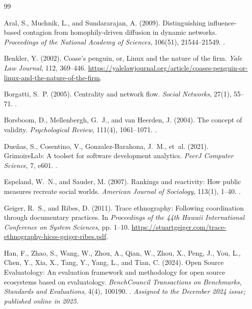 \begin{thebibliography}{99}
\label{refs:chapter11}

Aral, S., Muchnik, L., and Sundararajan, A. (2009).
Distinguishing influence-based contagion from homophily-driven diffusion in dynamic networks.
\emph{Proceedings of the National Academy of Sciences}, 106(51), 21544--21549.
.

Benkler, Y. (2002).
Coase's penguin, or, Linux and the nature of the firm.
\emph{Yale Law Journal}, 112, 369--446.
\url{https://yalelawjournal.org/article/coases-penguin-or-linux-and-the-nature-of-the-firm}.

Borgatti, S.~P. (2005).
Centrality and network flow.
\emph{Social Networks}, 27(1), 55--71.
.

Borsboom, D., Mellenbergh, G.~J., and van Heerden, J. (2004).
The concept of validity.
\emph{Psychological Review}, 111(4), 1061--1071.
.

Due\~nas, S., Cosentino, V., Gonzalez-Barahona, J.~M., et~al. (2021).
GrimoireLab: A toolset for software development analytics.
\emph{PeerJ Computer Science}, 7, e601.
.

Espeland, W.~N., and Sauder, M. (2007).
Rankings and reactivity: How public measures recreate social worlds.
\emph{American Journal of Sociology}, 113(1), 1--40.
.

Geiger, R.~S., and Ribes, D. (2011).
Trace ethnography: Following coordination through documentary practices.
In \emph{Proceedings of the 44th Hawaii International Conference on System Sciences}, pp. 1--10.
\url{https://stuartgeiger.com/trace-ethnography-hicss-geiger-ribes.pdf}.

Han, F., Zhao, S., Wang, W., Zhou, A., Qian, W., Zhou, X., Peng, J., You, L., Chen, Y., Xia, X., Tang, Y., Yang, L., and Tian, C. (2024).
Open Source Evaluatology: An evaluation framework and methodology for open source ecosystems based on evaluatology.
\emph{BenchCouncil Transactions on Benchmarks, Standards and Evaluations}, 4(4), 100190.
.
\emph{Assigned to the December 2024 issue; published online in 2025.}


\end{thebibliography}
